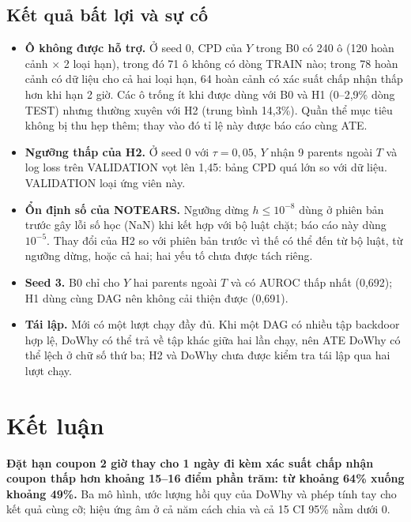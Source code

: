 \documentclass[pdflatex,sn-mathphys-num]{sn-jnl}%
\begin{document}
\subsection{Kết quả bất lợi và sự cố}\label{sec:failures}

\begin{itemize}
\item \textbf{Ô không được hỗ trợ.} Ở seed 0, CPD của $Y$ trong B0 có 240 ô (120 hoàn cảnh $\times$ 2 loại hạn), trong đó 71 ô không có dòng TRAIN nào; trong 78 hoàn cảnh có dữ liệu cho cả hai loại hạn, 64 hoàn cảnh có xác suất chấp nhận thấp hơn khi hạn 2 giờ. Các ô trống ít khi được dùng với B0 và H1 (0--2,9\% dòng TEST) nhưng thường xuyên với H2 (trung bình 14,3\%). Quần thể mục tiêu không bị thu hẹp thêm; thay vào đó tỉ lệ này được báo cáo cùng ATE.
\item \textbf{Ngưỡng thấp của H2.} Ở seed 0 với $\tau=0{,}05$, $Y$ nhận 9 parents ngoài $T$ và log loss trên VALIDATION vọt lên 1,45: bảng CPD quá lớn so với dữ liệu. VALIDATION loại ứng viên này.
\item \textbf{Ổn định số của NOTEARS.} Ngưỡng dừng $h \le 10^{-8}$ dùng ở phiên bản trước gây lỗi số học (NaN) khi kết hợp với bộ luật chặt; báo cáo này dùng $10^{-5}$. Thay đổi của H2 so với phiên bản trước vì thế có thể đến từ bộ luật, từ ngưỡng dừng, hoặc cả hai; hai yếu tố chưa được tách riêng.
\item \textbf{Seed 3.} B0 chỉ cho $Y$ hai parents ngoài $T$ và có AUROC thấp nhất (0,692); H1 dùng cùng DAG nên không cải thiện được (0,691).
\item \textbf{Tái lập.} Mới có một lượt chạy đầy đủ. Khi một DAG có nhiều tập backdoor hợp lệ, DoWhy có thể trả về tập khác giữa hai lần chạy, nên ATE DoWhy có thể lệch ở chữ số thứ ba; H2 và DoWhy chưa được kiểm tra tái lập qua hai lượt chạy.
\end{itemize}

\section{Kết luận}\label{sec:conclusion}

\textbf{Đặt hạn coupon 2 giờ thay cho 1 ngày đi kèm xác suất chấp nhận coupon thấp hơn khoảng 15--16 điểm phần trăm: từ khoảng 64\% xuống khoảng 49\%.} Ba mô hình, ước lượng hồi quy của DoWhy và phép tính tay cho kết quả cùng cỡ; hiệu ứng âm ở cả năm cách chia và cả 15 CI 95\% nằm dưới 0.
\end{document}
